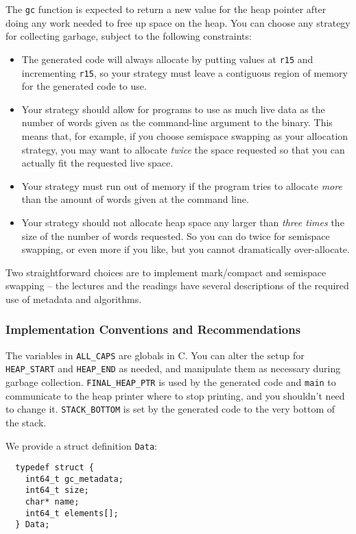 \documentclass[10pt, oneside]{article}
\begin{document}
The {\tt gc} function is expected to return a new value for the heap pointer
after doing any work needed to free up space on the heap. You can choose any
strategy for collecting garbage, subject to the following constraints:

\begin{itemize}
\item The generated code will always allocate by putting values at {\tt r15}
and incrementing {\tt r15}, so your strategy must leave a contiguous region
of memory for the generated code to use.
\item Your strategy should allow for programs to use as much live data as the
number of words given as the command-line argument to the binary. This means
that, for example, if you choose semispace swapping as your allocation
strategy, you may want to allocate {\it twice} the space requested so that
you can actually fit the requested live space.
\item Your strategy must run out of memory if the program tries to
allocate {\it more} than the amount of words given at the command line.
\item Your strategy should not allocate heap space any larger than {\it three
times} the size of the number of words requested. So you can do twice for
semispace swapping, or even more if you like, but you cannot dramatically
over-allocate.
\end{itemize}

Two straightforward choices are to implement mark/compact and semispace
swapping -- the lectures and the readings have several descriptions of the
required use of metadata and algorithms.

\subsubsection*{Implementation Conventions and Recommendations}

The variables in {\tt ALL\_CAPS} are globals in C. You can alter the setup
for {\tt HEAP\_START} and {\tt HEAP\_END} as needed, and manipulate them as
necessary during garbage collection. {\tt FINAL\_HEAP\_PTR} is used by the
generated code and {\tt main} to communicate to the heap printer where to
stop printing, and you shouldn't need to change it. {\tt STACK\_BOTTOM} is
set by the generated code to the very bottom of the stack.

We provide a struct definition {\tt Data}:

\begin{verbatim}
  typedef struct {
    int64_t gc_metadata;
    int64_t size;
    char* name;
    int64_t elements[];
  } Data;
\end{verbatim}
\end{document}
